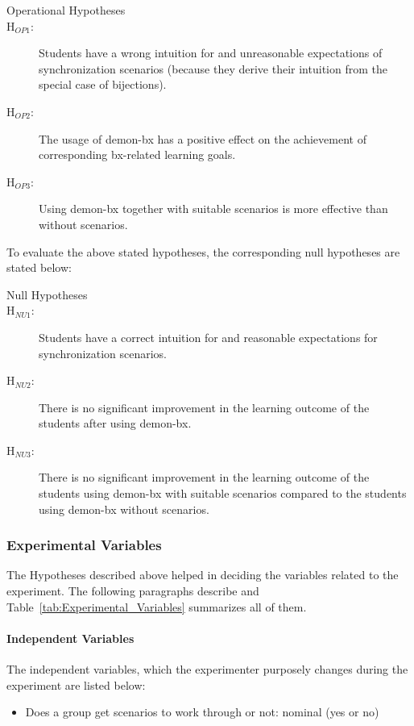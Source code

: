 \begin{description}
	\item[Operational Hypotheses]
	\item[H$_{OP1}$:] Students have a wrong intuition for and unreasonable expectations of synchronization scenarios (because they derive their intuition from the special case of bijections).
	\item[H$_{OP2}$:] The usage of demon-bx has a positive effect on the achievement of corresponding bx-related learning goals.
	\item[H$_{OP3}$:] Using demon-bx together with suitable scenarios is more effective than without scenarios.
\end{description}

To evaluate the above stated hypotheses, the corresponding null hypotheses are stated below:
\begin{description}
	\item[Null Hypotheses]
	\item[H$_{NU1}$:] Students have a correct intuition for and reasonable expectations for synchronization scenarios.
	\item[H$_{NU2}$:] There is no significant improvement in the learning outcome of the students after using demon-bx.
	\item[H$_{NU3}$:] There is no significant improvement in the learning outcome of the students using demon-bx with suitable scenarios compared to the students using demon-bx without scenarios.

\end{description}

\subsubsection{Experimental Variables}\label{subsubsec:expvariables}
The Hypotheses described above helped in deciding the variables related to the experiment. The following paragraphs describe and Table~\ref{tab:Experimental_Variables} summarizes all of them.

\paragraph{Independent Variables} The independent variables, which the experimenter purposely changes during the experiment are listed below:

\begin{itemize}
	\item Does a group get scenarios to work through or not: nominal (yes or no)
\end{itemize}

